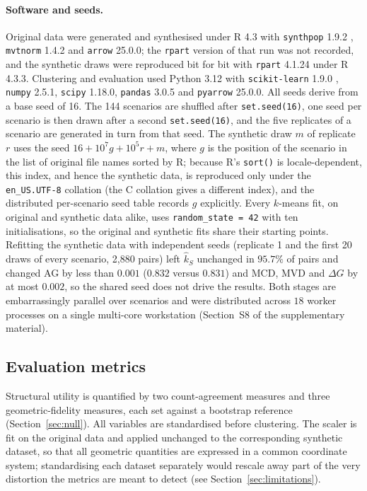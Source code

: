 \documentclass[pdflatex,referee]{sn-jnl}
\begin{document}
\paragraph{Software and seeds.}\label{sec:software} Original data were generated and synthesised
under \textsf{R} 4.3 \citep{rcore2024} with \texttt{synthpop} 1.9.2
\citep{nowok2016}, \texttt{mvtnorm} 1.4.2 and \texttt{arrow} 25.0.0; the
\texttt{rpart} version of that run was not recorded, and the synthetic draws
were reproduced bit for bit with \texttt{rpart} 4.1.24 under \textsf{R} 4.3.3.
Clustering and evaluation used Python 3.12 with \texttt{scikit-learn} 1.9.0
\citep{pedregosa2011}, \texttt{numpy} 2.5.1, \texttt{scipy} 1.18.0,
\texttt{pandas} 3.0.5 and \texttt{pyarrow} 25.0.0. All seeds derive from a
base seed of 16. The 144 scenarios are shuffled after \texttt{set.seed(16)},
one seed per scenario is then drawn after a second \texttt{set.seed(16)}, and
the five replicates of a scenario are generated in turn from that seed. The
synthetic draw $m$ of replicate $r$ uses the seed
$16 + 10^{7}g + 10^{5}r + m$, where $g$ is the position of the scenario in the
list of original file names sorted by \textsf{R}; because \textsf{R}'s
\texttt{sort()} is locale-dependent, this index, and hence the synthetic data,
is reproduced only under the \texttt{en\_US.UTF-8} collation (the C collation
gives a different index), and the distributed per-scenario seed table records
$g$ explicitly. Every $k$-means fit, on original and synthetic data alike, uses
\texttt{random\_state = 42} with ten initialisations, so the original and
synthetic fits share their starting points. Refitting the synthetic data with
independent seeds (replicate 1 and the first 20 draws of every scenario,
2{,}880 pairs) left $\hat{k}_S$ unchanged in $95.7\%$ of pairs and changed AG
by less than $0.001$ ($0.832$ versus $0.831$) and MCD, MVD and $\Delta G$ by at
most $0.002$, so the shared seed does not drive the results. Both stages are embarrassingly
parallel over scenarios and were distributed across $18$ worker processes on a
single multi-core workstation (Section~S8 of the supplementary material).

\subsection{Evaluation metrics}
\label{sec:metrics}

Structural utility is quantified by two count-agreement measures and three
geometric-fidelity measures, each set against a bootstrap reference
(Section~\ref{sec:null}). All variables are standardised before clustering.
The scaler is fit on the original data and applied unchanged to the
corresponding synthetic dataset, so that all geometric quantities are
expressed in a common coordinate system; standardising each dataset separately
would rescale away part of the very distortion the metrics are meant to detect
(see Section~\ref{sec:limitations}).
\end{document}
